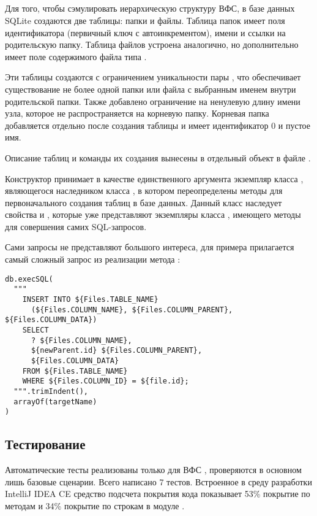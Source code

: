 \subsection{}
  Для того, чтобы сэмулировать иерархическую структуру ВФС, в базе данных SQLite создаются две таблицы: папки и файлы. Таблица папок имеет поля идентификатора (первичный ключ с автоинкрементом), имени и ссылки на родительскую папку. Таблица файлов устроена аналогично, но дополнительно имеет поле содержимого файла типа . 

  Эти таблицы создаются с ограничением уникальности пары  , что обеспечивает существование не более одной папки или файла с выбранным именем внутри родительской папки.
  Также добавлено ограничение на ненулевую длину имени узла, которое не распространяется на корневую папку. Корневая папка добавляется отдельно после создания таблицы и имеет идентификатор $0$ и пустое имя.
  
  Описание таблиц и команды их создания вынесены в отдельный объект в файле .

  Конструктор  принимает в качестве единственного аргумента экземпляр класса , являющегося наследником класса , в котором переопределены методы для первоначального создания таблиц в базе данных. Данный класс наследует свойства  и , которые уже представляют экземпляры класса , имеющего методы для совершения самих SQL-запросов.

  Сами запросы не представляют большого интереса, для примера прилагается самый сложный запрос из реализации метода :
  \begin{verbatim}
db.execSQL(
  """
    INSERT INTO ${Files.TABLE_NAME} 
      (${Files.COLUMN_NAME}, ${Files.COLUMN_PARENT}, ${Files.COLUMN_DATA})
    SELECT 
      ? ${Files.COLUMN_NAME},
      ${newParent.id} ${Files.COLUMN_PARENT},
      ${Files.COLUMN_DATA}
    FROM ${Files.TABLE_NAME}
    WHERE ${Files.COLUMN_ID} = ${file.id};
  """.trimIndent(),
  arrayOf(targetName)
)    
  \end{verbatim}

\subsection{Тестирование}
  Автоматические тесты реализованы только для ВФС , проверяются в основном лишь базовые сценарии. Всего написано 7 тестов. Встроенное в среду разработки IntelliJ IDEA CE средство подсчета покрытия кода показывает 53\% покрытие по методам и 34\% покрытие по строкам в модуле .

